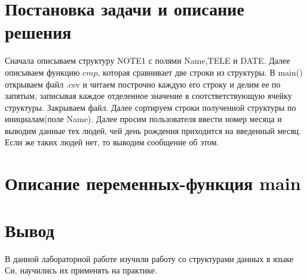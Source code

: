 \documentclass[a4paper,12pt]{report}
\begin{document}
\section*{Постановка задачи и описание решения}
\par

Сначала описываем структуру NOTE1 с полями Name,TELE и DATE. 
Далее описываем функцию $cmp$, которая сравнивает две строки из структуры.
В main() открываем файл .csv и читаем построчно каждую его строку и делим ее по запятым, записывая каждое отделенное значение в соотстветствующую ячейку структуры.
Закрываем файл.
Далее сортируем строки полученной структуры по инициалам(поле Name).
Далее просим пользователя ввести номер месяца и выводим данные тех людей, чей день рождения приходится на введенный месяц. 
Если же таких людей нет, то выводим сообщение об этом.

\section*{Описание переменных-функция main}
\begin{centering}
\end{centering}

\newpage

\section*{Вывод}
В данной лабораторной работе изучили работу со структурами данных в языке Си, научились их применять на практике.
\end{document}
